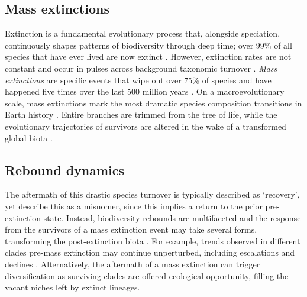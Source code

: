 \documentclass[titlepage]{article}
\begin{document}
\subsection{Mass extinctions}
Extinction is a fundamental evolutionary process that, alongside speciation, continuously shapes patterns of biodiversity through deep time; over 99\% of all species that have ever lived are now extinct \citep{raup1981extintion}.
However, extinction rates are not constant and occur in pulses across background taxonomic turnover \citep{raup_mass_1982}. 
\textit{Mass extinctions} are specific events that wipe out over 75\% of species and have happened five times over the last 500 million years \citep{raup_mass_1982}. 
On a macroevolutionary scale, mass extinctions mark the most dramatic species composition transitions in Earth history \citep{jablonski_lessons_2001}.
Entire branches are trimmed from the tree of life, while the evolutionary trajectories of survivors are altered in the wake of a transformed global biota \citep{hull_life_2015}. %

\subsection{Rebound dynamics}
The aftermath of this drastic species turnover is typically described as `recovery', yet \cite{jablonski2025mass} describe this as a misnomer, since this implies a return to the prior pre-extinction state.
Instead, biodiversity rebounds are multifaceted and the response from the survivors of a mass extinction event may take several forms, transforming the post-extinction biota \citep{hull_life_2015}.
For example, trends observed in different clades pre-mass extinction may continue unperturbed, including escalations \citep{hansen1999effect} and declines \citep{raup1981extintion}.
Alternatively, the aftermath of a mass extinction can trigger diversification as surviving clades are offered ecological opportunity, filling the vacant niches left by extinct lineages.
\end{document}
